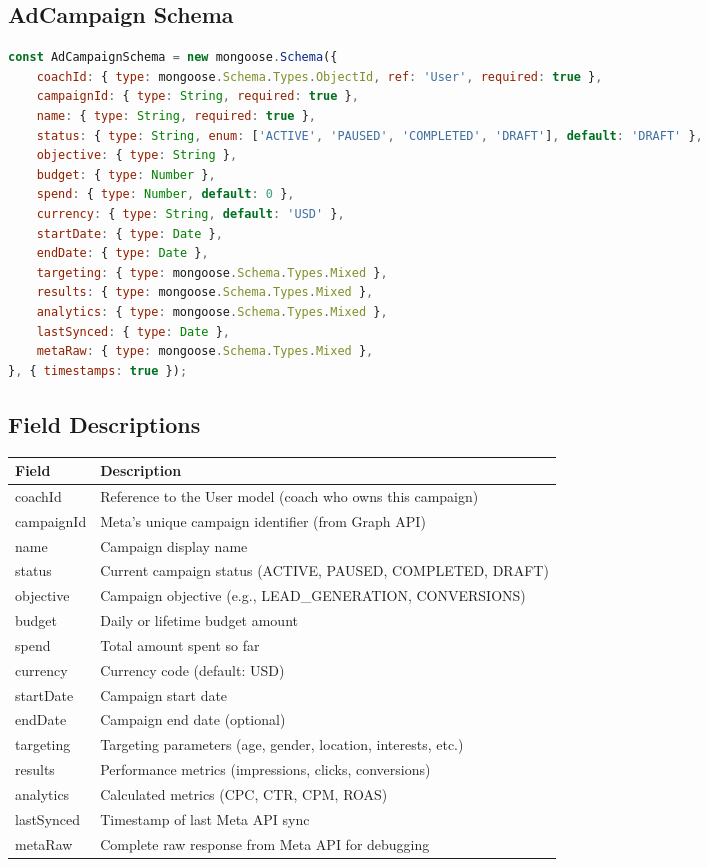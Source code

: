 \documentclass[11pt,a4paper]{article}
\begin{document}
\subsection{AdCampaign Schema}
\begin{lstlisting}[language=JavaScript]
const AdCampaignSchema = new mongoose.Schema({
    coachId: { type: mongoose.Schema.Types.ObjectId, ref: 'User', required: true },
    campaignId: { type: String, required: true },
    name: { type: String, required: true },
    status: { type: String, enum: ['ACTIVE', 'PAUSED', 'COMPLETED', 'DRAFT'], default: 'DRAFT' },
    objective: { type: String },
    budget: { type: Number },
    spend: { type: Number, default: 0 },
    currency: { type: String, default: 'USD' },
    startDate: { type: Date },
    endDate: { type: Date },
    targeting: { type: mongoose.Schema.Types.Mixed },
    results: { type: mongoose.Schema.Types.Mixed },
    analytics: { type: mongoose.Schema.Types.Mixed },
    lastSynced: { type: Date },
    metaRaw: { type: mongoose.Schema.Types.Mixed },
}, { timestamps: true });
\end{lstlisting}

\subsection{Field Descriptions}
\begin{longtable}{L{3.5cm}L{11cm}}
\toprule
\textbf{Field} & \textbf{Description} \\
\midrule
coachId & Reference to the User model (coach who owns this campaign) \\
campaignId & Meta's unique campaign identifier (from Graph API) \\
name & Campaign display name \\
status & Current campaign status (ACTIVE, PAUSED, COMPLETED, DRAFT) \\
objective & Campaign objective (e.g., LEAD\_GENERATION, CONVERSIONS) \\
budget & Daily or lifetime budget amount \\
spend & Total amount spent so far \\
currency & Currency code (default: USD) \\
startDate & Campaign start date \\
endDate & Campaign end date (optional) \\
targeting & Targeting parameters (age, gender, location, interests, etc.) \\
results & Performance metrics (impressions, clicks, conversions) \\
analytics & Calculated metrics (CPC, CTR, CPM, ROAS) \\
lastSynced & Timestamp of last Meta API sync \\
metaRaw & Complete raw response from Meta API for debugging \\
\bottomrule
\end{longtable}
\end{document}

